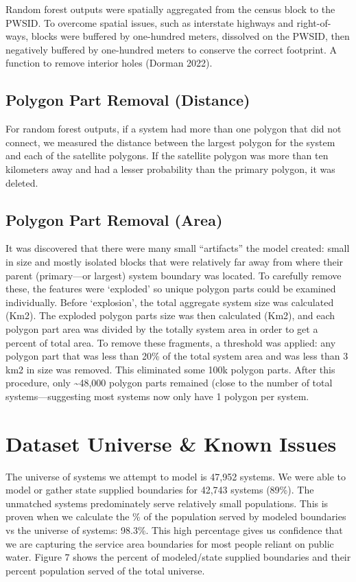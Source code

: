 \documentclass[
  letterpaper,
  DIV=11,
  numbers=noendperiod,
  oneside]{scrartcl}
\begin{document}
Random forest outputs were spatially aggregated from the census block to
the PWSID. To overcome spatial issues, such as interstate highways and
right-of-ways, blocks were buffered by one-hundred meters, dissolved on
the PWSID, then negatively buffered by one-hundred meters to conserve
the correct footprint. A function to remove interior holes (Dorman
2022).

\subsection{Polygon Part Removal
(Distance)}\label{polygon-part-removal-distance}

For random forest outputs, if a system had more than one polygon that
did not connect, we measured the distance between the largest polygon
for the system and each of the satellite polygons. If the satellite
polygon was more than ten kilometers away and had a lesser probability
than the primary polygon, it was deleted.

\subsection{Polygon Part Removal
(Area)}\label{polygon-part-removal-area}

It was discovered that there were many small ``artifacts'' the model
created: small in size and mostly isolated blocks that were relatively
far away from where their parent (primary---or largest) system boundary
was located. To carefully remove these, the features were `exploded' so
unique polygon parts could be examined individually. Before `explosion',
the total aggregate system size was calculated (Km2). The exploded
polygon parts size was then calculated (Km2), and each polygon part area
was divided by the totally system area in order to get a percent of
total area. To remove these fragments, a threshold was applied: any
polygon part that was less than 20\% of the total system area and was
less than 3 km2 in size was removed. This eliminated some 100k polygon
parts. After this procedure, only \textasciitilde48,000 polygon parts
remained (close to the number of total systems---suggesting most systems
now only have 1 polygon per system.

\section{Dataset Universe \& Known
Issues}\label{dataset-universe-known-issues}

The universe of systems we attempt to model is 47,952 systems. We were
able to model or gather state supplied boundaries for 42,743 systems
(89\%). The unmatched systems predominately serve relatively small
populations. This is proven when we calculate the \% of the population
served by modeled boundaries vs the universe of systems: 98.3\%. This
high percentage gives us confidence that we are capturing the service
area boundaries for most people reliant on public water. Figure 7 shows
the percent of modeled/state supplied boundaries and their percent
population served of the total universe.
\end{document}
